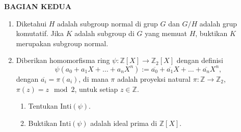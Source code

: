 \documentclass[12pt,twoside]{article}
\begin{document}
\pagebreak
\textbf{BAGIAN KEDUA}
\begin{enumerate}
	\item Diketahui \( H \) adalah subgroup normal di grup \( G \) dan \( G/H \) adalah grup komutatif. Jika \( K \) adalah subgroup di \( G \) yang memuat \( H \), buktikan \( K \) merupakan subgroup normal.

	\item Diberikan homomorfisma ring \( \psi: \mathbb{Z}[X] \to \mathbb{Z}_2[X] \) dengan definisi
	      \[
		      \psi(a_0 + a_1X + \dots + a_nX^n) := \overline{a_0} + \overline{a_1}X + \dots + \overline{a_n}X^n,
	      \]
	      dengan \( \overline{a_i} = \pi(a_i) \), di mana \( \pi \) adalah proyeksi natural \( \pi: \mathbb{Z} \to \mathbb{Z}_2 \), \( \pi(z) = z \mod 2 \), untuk setiap \( z \in \mathbb{Z} \).

	      \begin{enumerate}
		      \item Tentukan \( \text{Inti}(\psi) \).
		      \item Buktikan \( \text{Inti}(\psi) \) adalah ideal prima di \( \mathbb{Z}[X] \).
	      \end{enumerate}
\end{enumerate}

\pagebreak
\end{document}

